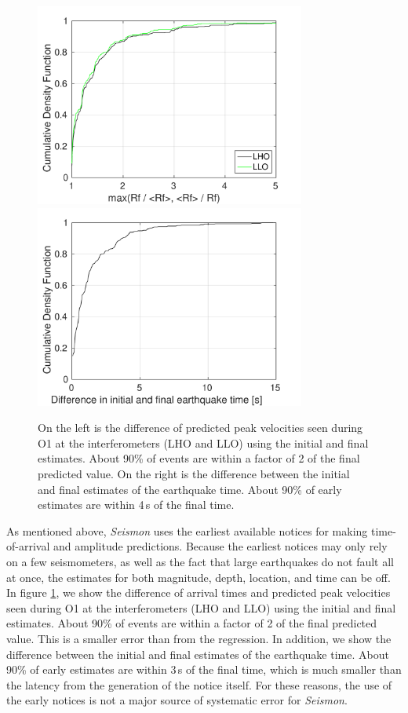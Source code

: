 \documentclass[reprint, prl, aps, showpacs]{revtex4-1}
\begin{document}
\begin{figure}[t]
\hspace*{-0.5cm}
 \includegraphics[width=3.5in]{initial_vs_final.pdf}
 \includegraphics[width=3.5in]{lockloss_est_timediff.pdf}
 \caption{On the left is the difference of predicted peak velocities seen during O1 at the interferometers (LHO and LLO) using the initial and final estimates. About 90\% of events are within a factor of 2 of the final predicted value. On the right is the difference between the initial and final estimates of the earthquake time. About 90\% of early estimates are within 4\,s of the final time.}
 \label{fig:initialvsfinal}
\end{figure}

As mentioned above, \emph{Seismon} uses the earliest available notices for making time-of-arrival and amplitude predictions. Because the earliest notices may only rely on a few seismometers, as well as the fact that large earthquakes do not fault all at once, the estimates for both magnitude, depth, location, and time can be off. In figure \ref{fig:initialvsfinal}, we show the difference of arrival times and predicted peak velocities seen during O1 at the interferometers (LHO and LLO) using the initial and final estimates. About 90\% of events are within a factor of 2 of the final predicted value. This is a smaller error than from the regression. In addition, we show the difference between the initial and final estimates of the earthquake time. About 90\% of early estimates are within 3\,s of the final time, which is much smaller than the latency from the generation of the notice itself.
For these reasons, the use of the early notices is not a major source of systematic error for \emph{Seismon}.
\end{document}
